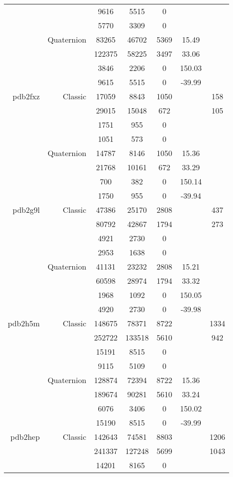 \begin{xltabular}{\textwidth}{r|rcccSc}
& & 9616 & 5515 & 0 & & \\
& & 5770 & 3309 & 0 & & \\
& Quaternion & 83265 & 46702 & 5369 & 15.49 & \\
& & 122375 & 58225 & 3497 & 33.06 & \\
& & 3846 & 2206 & 0 & 150.03 & \\
& & 9615 & 5515 & 0 & -39.99 & \\ \addlinespace
pdb2fxz & Classic & 17059 & 8843 & 1050 & & 158 \\
& & 29015 & 15048 & 672 & & 105 \\
& & 1751 & 955 & 0 & & \\
& & 1051 & 573 & 0 & & \\
& Quaternion & 14787 & 8146 & 1050 & 15.36 & \\
& & 21768 & 10161 & 672 & 33.29 & \\
& & 700 & 382 & 0 & 150.14 & \\
& & 1750 & 955 & 0 & -39.94 & \\ \addlinespace
pdb2g9l & Classic & 47386 & 25170 & 2808 & & 437 \\
& & 80792 & 42867 & 1794 & & 273 \\
& & 4921 & 2730 & 0 & & \\
& & 2953 & 1638 & 0 & & \\
& Quaternion & 41131 & 23232 & 2808 & 15.21 & \\
& & 60598 & 28974 & 1794 & 33.32 & \\
& & 1968 & 1092 & 0 & 150.05 & \\
& & 4920 & 2730 & 0 & -39.98 & \\ \addlinespace
pdb2h5m & Classic & 148675 & 78371 & 8722 & & 1334 \\
& & 252722 & 133518 & 5610 & & 942 \\
& & 15191 & 8515 & 0 & & \\
& & 9115 & 5109 & 0 & & \\
& Quaternion & 128874 & 72394 & 8722 & 15.36 & \\
& & 189674 & 90281 & 5610 & 33.24 & \\
& & 6076 & 3406 & 0 & 150.02 & \\
& & 15190 & 8515 & 0 & -39.99 & \\ \addlinespace
pdb2hep & Classic & 142643 & 74581 & 8803 & & 1206 \\
& & 241337 & 127248 & 5699 & & 1043 \\
& & 14201 & 8165 & 0 & & \\

\end{xltabular}
